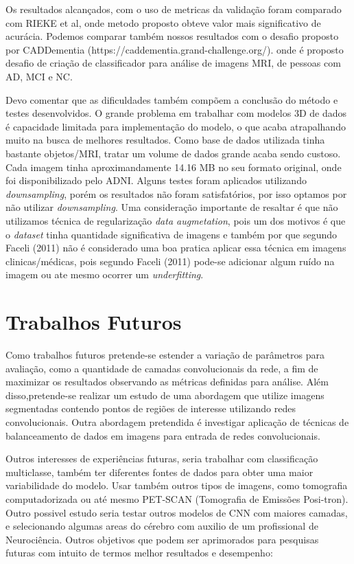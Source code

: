 \documentclass[openright]{UFRGS} %
\begin{document}
Os resultados alcançados, com o uso de metricas da validação foram 
comparado com   RIEKE et al, onde metodo proposto obteve valor mais significativo de acurácia. Podemos comparar também nossos resultados com
o desafio proposto por CADDementia (https://caddementia.grand-challenge.org/). onde é proposto desafio de criação de classificador para análise de imagens MRI, de pessoas com AD, MCI e NC. 


Devo comentar que as dificuldades também compõem a conclusão do método e testes desenvolvidos. O grande problema em trabalhar com
modelos 3D de dados é capacidade   limitada para implementação do modelo, o que acaba atrapalhando muito na busca de melhores resultados. Como base de dados utilizada tinha bastante objetos/MRI, tratar  um volume de dados grande acaba sendo custoso.
Cada imagem tinha aproximandamente 14.16 MB  no seu formato original, onde foi disponibilizado pelo ADNI. Alguns testes foram  aplicados utilizando 
\textit{downsampling}, porém os resultados não foram satisfatórios, por isso optamos por não utilizar \textit{downsampling}. 
Uma consideração importante de resaltar é que não utilizamos técnica de regularização \textit{data augmetation}, pois um dos motivos é que o \textit{dataset} 
tinha quantidade 
significativa de imagens e também  por  que segundo Faceli (2011)  não é considerado uma boa pratica aplicar essa técnica em imagens clinicas/médicas,
pois segundo Faceli (2011) pode-se adicionar algum ruído na imagem ou ate mesmo ocorrer um \textit{underfitting}.



\chapter{Trabalhos Futuros}


Como trabalhos futuros pretende-se estender a variação de parâmetros para avaliação, como a quantidade de camadas convolucionais da rede, a ﬁm de maximizar os resultados observando as métricas deﬁnidas para análise. Além disso,pretende-se realizar um estudo de uma abordagem que utilize imagens segmentadas contendo pontos de regiões de interesse utilizando redes convolucionais. Outra abordagem pretendida é investigar aplicação de técnicas de balanceamento de dados em imagens para entrada de redes convolucionais.


Outros interesses de experiências futuras, seria trabalhar com classificação multiclasse, também ter  diferentes fontes de dados para obter uma maior variabilidade do modelo. Usar também outros tipos de imagens, como tomografia computadorizada ou até mesmo PET-SCAN (Tomografia de Emissões Posi-tron). Outro possivel estudo seria  testar outros modelos de CNN com maiores camadas, e selecionando
algumas areas do cérebro com auxilio de um profissional de Neurociência. Outros objetivos que podem ser aprimorados  para  pesquisas futuras com intuito  de termos melhor resultados e desempenho:
\end{document}
